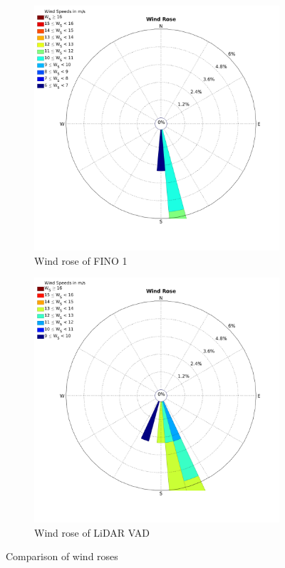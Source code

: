 \documentclass[10pt]{article}
\begin{document}
\begin{figure}[htb!]
\label{fig:WindRose1_valdidation}
\begin{subfigure}{0.5\textwidth}
  \centering
  \includegraphics[width=1\linewidth]{../Exercises_and_Tasks/ex2/figures/WindRose_Fino1.png}
  \caption{Wind rose of FINO 1}
\end{subfigure}
\begin{subfigure}{0.5\textwidth}
  \centering
  \includegraphics[width=1\linewidth]{../Exercises_and_Tasks/ex2/figures/WindRose_lidar.png}
  \caption{Wind rose of LiDAR VAD}
\end{subfigure}
\caption{Comparison of wind roses}
  \label{fig:WindrosesVal}
\end{figure}
\end{document}
